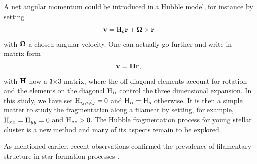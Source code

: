  A net angular momentum could be introduced in a Hubble model, for instance by setting 
\begin{equation}
\bold{v} = {\textrm{H}}_o \bold{r} + \bold{\Omega} \times \bold{r}
\end{equation} 
with $\bold{\Omega}$ a chosen angular velocity. One can actually go further and write in matrix form
\begin{equation}
\bold{v} = \bold{H}\bold{r},
\end{equation}
with $\bold{H}$ now a 3$\times$3 matrix, where the off-diagonal elements account for rotation and the elements on the diagonal ${\textrm{H}}_{ii}$ control the three dimensional expansion. In this study, we have set ${\textrm{H}}_{ij,i\ne j}=0$ and ${\textrm{H}}_{ii}={\textrm{H}}_o$ otherwise. It is then a simple matter to study the fragmentation along a filament by setting, for example, ${\textrm{H}}_{xx}={\textrm{H}}_{yy}=0$ and ${\textrm{H}}_{zz}>0$. The Hubble fragmentation process for young stellar cluster is a new method and many of its aspects remain to be explored.


 As mentioned earlier, recent observations confirmed the prevalence of filamentary structure in star formation processes \citep{Andre2010}. 



